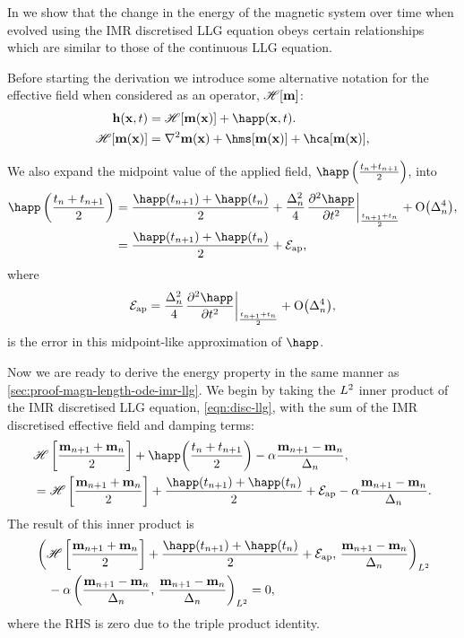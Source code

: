 \newcommand{\happerror}{\mathcal{E}_\text{ap}}

In  we show that the change in the energy of the magnetic system over time when evolved using the IMR discretised LLG equation obeys certain relationships which are similar to those of the continuous LLG equation.

Before starting the derivation we introduce some alternative notation for the effective field when considered as an operator, $\mathscr{H} {\left[ \boldsymbol{\mathrm{m}} \right]}$:
\begin{equation}
  \begin{aligned}
    \label{eq:hop}
    \hv(\xv, t) &= \hopb{\mv(\xv)} + \happ(\xv, t). \\
    \hopb{\mv(\xv)} &= \lap \mv(\xv) + \hms[\mv(\xv)] + \hca[\mv(\xv)], \\
  \end{aligned}
\end{equation}

We also expand the midpoint value of the applied field, $\mphapp$, into
\begin{equation}
  \begin{aligned}
    \mphapp &= \frac{\happ(t_{n+1}) + \happ(t_n)}{2}
    + \frac{\dtn^2}{4} \evalatb{\spd{\happ}{t}}{\frac{t_{n+1} + t_n}{2}}  + \order{\dtn^4}, \\
    &= \frac{\happ(t_{n+1}) + \happ(t_n)}{2} + \happerror,
    \label{eq:happ-midpoint}
  \end{aligned}
\end{equation}
where
\begin{equation}
  \happerror = \frac{\dtn^2}{4} \evalatb{\spd{\happ}{t}}{\frac{t_{n+1} + t_n}{2}}  + \order{\dtn^4},
\end{equation}
is the error in this midpoint-like approximation of $\happ$.

Now we are ready to derive the energy property in the same manner as \cref{sec:proof-magn-length-ode-imr-llg}.
We begin by taking the ${L^2}$ inner product of the IMR discretised LLG equation, \cref{eqn:disc-llg}, with the sum of the IMR discretised effective field and damping terms:
\begin{equation}
  \begin{aligned}
  & \mphop + \happ\bigb{\mpt} - \dampc \mpdmdt, \\
  &= \mphop + \frac{\happ(t_{n+1}) + \happ(t_n)}{2} + \happerror - \dampc \mpdmdt.
  \end{aligned}
\end{equation}
The result of this inner product is
\begin{equation}
  \begin{aligned}
    &\ltip{\mphop + \frac{\happ(t_{n+1}) + \happ(t_n)}{2} + \happerror}{\mpdmdt} \\
    & \quad - \dampc \ltip{\mpdmdt}{\mpdmdt} = 0,
    \label{eq:54}
  \end{aligned}
\end{equation}
where the RHS is zero due to the triple product identity.

